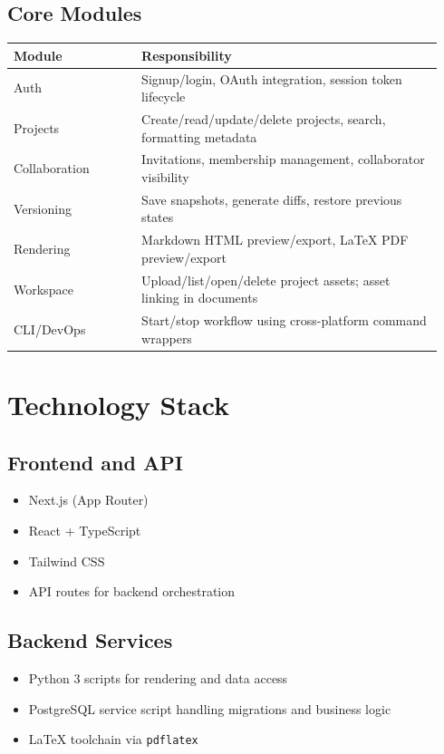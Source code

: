 \documentclass[11pt,a4paper]{article}
\begin{document}
\subsection{Core Modules}
\begin{longtable}{p{0.28\linewidth} p{0.66\linewidth}}
\toprule
\textbf{Module} & \textbf{Responsibility} \\
\midrule
Auth & Signup/login, OAuth integration, session token lifecycle \\
Projects & Create/read/update/delete projects, search, formatting metadata \\
Collaboration & Invitations, membership management, collaborator visibility \\
Versioning & Save snapshots, generate diffs, restore previous states \\
Rendering & Markdown HTML preview/export, LaTeX PDF preview/export \\
Workspace & Upload/list/open/delete project assets; asset linking in documents \\
CLI/DevOps & Start/stop workflow using cross-platform command wrappers \\
\bottomrule
\end{longtable}

\section{Technology Stack}
\subsection{Frontend and API}
\begin{itemize}[leftmargin=1.5em]
  \item Next.js (App Router)
  \item React + TypeScript
  \item Tailwind CSS
  \item API routes for backend orchestration
\end{itemize}

\subsection{Backend Services}
\begin{itemize}[leftmargin=1.5em]
  \item Python 3 scripts for rendering and data access
  \item PostgreSQL service script handling migrations and business logic
  \item LaTeX toolchain via \texttt{pdflatex}
\end{itemize}
\end{document}
